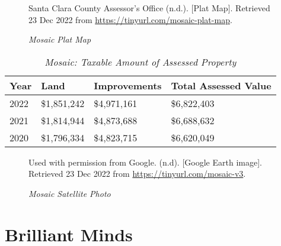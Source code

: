 \begin{figure}[hbtp]
  \caption[Mosaic Plat Map]{\textit{Mosaic Plat Map}}%
  \label{fig:mosaic-plat-map}
  {Santa Clara County Assessor's Office (n.d.). [Plat Map]. Retrieved 23 Dec 2022 from  \url{https://tinyurl.com/mosaic-plat-map}.}
\end{figure}

\begin{table}[hbtp]
  \SingleSpacing%
  \caption[Mosaic: Taxable Amount of Assessed Propery]{\textit{Mosaic: Taxable Amount of Assessed Property}}%
  \label{tab:mosaic-taxable-amount}
  \begin{tabular}{llll}
    \toprule
    Year & Land        & Improvements & Total Assessed Value \\
    \midrule
    2022 & \$1,851,242 & \$4,971,161 & \$6,822,403 \\
    2021 & \$1,814,944 & \$4,873,688 & \$6,688,632 \\
    2020 & \$1,796,334 & \$4,823,715 & \$6,620,049 \\
    \bottomrule
  \end{tabular}
\end{table}

\begin{figure}[ht]
  \caption[Mosaic Satellite Photo]{\textit{Mosaic Satellite Photo}}%
  \label{fig:mosaic-sat-photo}
  {Used with permission from Google. (n.d). [Google Earth image]. Retrieved 23 Dec 2022 from \url{https://tinyurl.com/mosaic-v3}.}
\end{figure}


\clearpage
\section{Brilliant Minds}\label{sec:brilliant-minds-info}\indent

